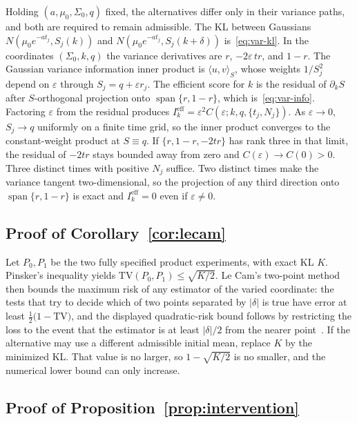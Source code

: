 \documentclass[anon,11pt]{alt2027}
\providecommand{\qed}{\hfill\BlackBox}
\begin{document}
Holding $(a,\mu_0,\Sigma_0,q)$ fixed, the alternatives differ only in their
variance paths, and both are required to remain admissible. The KL between
Gaussians $N(\mu_0 e^{-at_j},S_j(k))$ and
$N(\mu_0 e^{-at_j},S_j(k+\delta))$ is~\eqref{eq:var-kl}. In the coordinates
$(\Sigma_0,k,q)$ the variance derivatives are $r$, $-2\varepsilon\, t r$, and
$1-r$. The Gaussian variance information inner product is
$\langle u,v\rangle_S$, whose weights $1/S_j^2$ depend on $\varepsilon$ through
$S_j=q+\varepsilon r_j$. The efficient score for $k$ is the residual of
$\partial_k S$ after $S$-orthogonal projection onto
$\operatorname{span}\{r,1-r\}$, which is~\eqref{eq:var-info}. Factoring
$\varepsilon$ from the residual produces
$I_k^{\mathrm{eff}}=\varepsilon^2 C(\varepsilon;k,q,\{t_j,N_j\})$. As $\varepsilon\to 0$,
$S_j\to q$ uniformly on a finite time grid, so the inner product converges to
the constant-weight product at $S\equiv q$. If
$\{r,1-r,-2tr\}$ has rank three in that limit, the residual of $-2tr$ stays
bounded away from zero and $C(\varepsilon)\to C(0)>0$. Three distinct times with
positive $N_j$ suffice. Two distinct times make the variance tangent
two-dimensional, so the projection of any third direction onto
$\operatorname{span}\{r,1-r\}$ is exact and $I_k^{\mathrm{eff}}=0$ even if
$\varepsilon\neq 0$.\qed

\subsection{Proof of Corollary~\ref{cor:lecam}}

Let $P_0,P_1$ be the two fully specified product experiments, with exact KL
$K$. Pinsker's inequality yields $\mathrm{TV}(P_0,P_1)\le\sqrt{K/2}$.
Le Cam's two-point method then bounds the maximum risk of any estimator of
the varied coordinate: the tests that try to decide which of two points
separated by $|\delta|$ is true have error at least
$\frac12\bigl(1-\mathrm{TV}\bigr)$, and the displayed quadratic-risk bound
follows by restricting the loss to the event that the estimator is at least
$|\delta|/2$ from the nearer point~\cite[Theorem~2.2]{Tsybakov09}.
If the alternative may use a different admissible initial mean, replace $K$
by the minimized KL. That value is no larger, so $1-\sqrt{K/2}$ is no smaller,
and the numerical lower bound can only increase.\qed

\subsection{Proof of Proposition~\ref{prop:intervention}}
\end{document}
